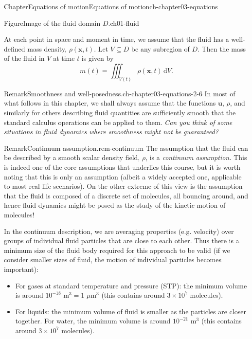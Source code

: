 \documentclass[oneside,10pt,]{book}
\numberwithin{equation}{section}
\newcommand{\bx}{\boldsymbol{x}}
\newcommand{\bu}{\boldsymbol{u}}
\begin{document}
\begin{chapterptx}{Chapter}{Equations of motion}{}{Equations of motion}{}{}{ch-chapter03-equations}
\begin{introduction}{}
\begin{figureptx}{Figure}{Image of the fluid domain \(D\).}{ch01-fluid}{}
\begin{image}{0.25}{0.5}{0.25}{}
\end{image}%
\tcblower
\end{figureptx}%
At each point in space and moment in time, we assume that the fluid has a well-defined mass density, \(\rho(\bx, t)\). Let \(V \subseteq D\) be any subregion of \(D\). Then the mass of the fluid in \(V\) at time \(t\) is given by%
\begin{equation}
m(t) = \iiint_{V(t)} \rho(\bx, t) \, \mathrm{d}V.     \label{eqn-mass}
\end{equation}
%
\begin{remark}{Remark}{Smoothness and well-posedness.}{ch-chapter03-equations-2-6}%
In most of what follows in this chapter, we shall always assume that the functions \(\bu\), \(\rho\), and similarly for others describing fluid quantities are sufficiently smooth that the standard calculus operations can be applied to them. \emph{Can you think of some situations in fluid dynamics where smoothness might not be guaranteed?}%
\end{remark}
\begin{remark}{Remark}{Continuum assumption.}{rem-continuum}%
The assumption that the fluid can be described by a smooth scalar density field, \(\rho\), is a \emph{continuum assumption.} This is indeed one of the core assumptions that underlies this course, but it is worth noting that this is only an assumption (albeit a widely accepted one, applicable to most real-life scenarios). On the other extreme of this view is the assumption that the fluid is composed of a discrete set of molecules, all bouncing around, and hence fluid dynamics might be posed as the study of the kinetic motion of molecules!%
\par
In the continuum description, we are averaging properties (e.g. velocity) over groups of individual fluid particles that are close to each other. Thus there is a minimum size of the fluid body required for this approach to be valid (if we consider smaller sizes of fluid, the motion of individual particles becomes important):%
\begin{itemize}[label=\textbullet]
\item{}For gases at standard temperature and pressure (STP): the minimum volume is around \(10^{-18}\) m\(^3=1\) \(\mu\)m\(^3\) (this contains around \(3\times10^7\) molecules).%
\item{}For liquids: the minimum volume of fluid is smaller as the particles are closer together. For water, the minimum volume is around \(10^{-21}\) m\(^3\) (this contains around \(3\times10^7\) molecules).%

\end{itemize}
\end{remark}
\end{introduction}
\end{chapterptx}
\end{document}
